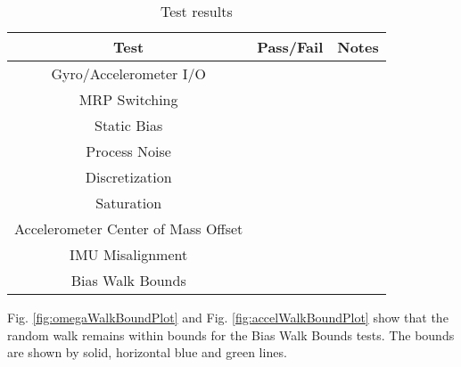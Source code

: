 \begin{table}[H]
	\caption{Test results}
	\label{tab:results}
	\centering \fontsize{10}{10}\selectfont
	\begin{tabular}{c | c | c  } %
		\hline
		\textbf{Test} 						  			   & \textbf{Pass/Fail} 						   			& \textbf{Notes} 									\\ \hline
		Gyro/Accelerometer I/O 		   				&               & 			 \\ \hline
		MRP Switching 					   				&  	   &   \\ \hline
		Static Bias 										 &  				 &  				   \\ \hline
		Process Noise 							         &  				& 				 \\ \hline
		Discretization 						  			   &     &   \\ \hline
		Saturation 							   				&   		 &        \\ \hline
		Accelerometer Center of Mass Offset &     &   \\ \hline
		IMU Misalignment 							   &      &   \\ \hline
		Bias Walk Bounds 							   &    & \\ \hline
	\end{tabular}
\end{table}

Fig. \ref{fig:omegaWalkBoundPlot} and Fig. \ref{fig:accelWalkBoundPlot} show that the random walk remains within bounds for the Bias Walk Bounds tests. The bounds are shown by solid, horizontal blue and green lines.

 \label{fig:omegaWalkBoundPlot}
 \label{fig:accelWalkBoundPlot}

\pagebreak %